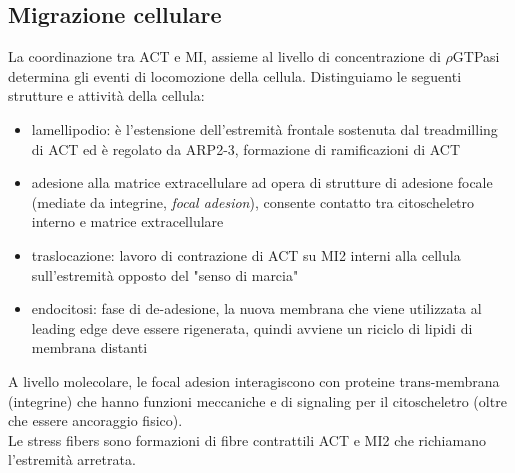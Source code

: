     \subsection{Migrazione cellulare}
        La coordinazione tra ACT e MI, assieme al livello di concentrazione di $\rho$GTPasi determina gli eventi di locomozione della cellula. Distinguiamo le seguenti strutture e attività della cellula:
        \begin{itemize}
            \item lamellipodio: è l'estensione dell'estremità frontale sostenuta dal treadmilling di ACT ed è regolato da ARP2-3, formazione di ramificazioni di ACT
            \item adesione alla matrice extracellulare ad opera di strutture di adesione focale (mediate da integrine,\textit{ focal adesion}), consente contatto tra citoscheletro interno e matrice extracellulare
            \item traslocazione: lavoro di contrazione di ACT su MI2 interni alla cellula sull'estremità opposto del "senso di marcia"
            \item endocitosi: fase di de-adesione, la nuova membrana che viene utilizzata al leading edge deve essere rigenerata, quindi avviene un riciclo di lipidi di membrana distanti
        \end{itemize}
        
        A livello molecolare, le focal adesion interagiscono con proteine trans-membrana (integrine) che hanno funzioni meccaniche e di signaling per il citoscheletro (oltre che essere ancoraggio fisico). \\
        Le stress fibers sono formazioni di fibre contrattili ACT e MI2 che richiamano l'estremità arretrata.
        
